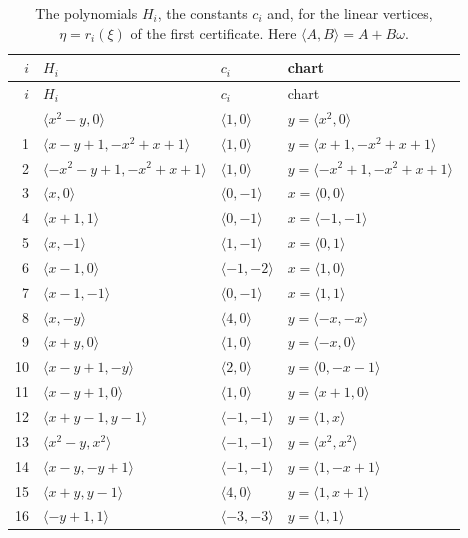 \documentclass[11pt]{article}
\begin{document}
\clearpage
\begingroup\small
\setlength{\LTcapwidth}{\textwidth}
\begin{longtable}{@{}rlll@{}}
\caption{The polynomials $H_i$, the constants $c_i$ and, for the linear vertices, $\eta=r_i(\xi)$ of the first certificate. Here $\langle A,B\rangle=A+B\omega$.}\label{tab:vert1}\\
\hline $i$ & $H_i$ & $c_i$ & chart\\\hline\endfirsthead\hline $i$ & $H_i$ & $c_i$ & chart\\\hline\endhead\hline\endfoot
0 & $\langle x^{2}-y,0\rangle$ & $\langle 1,0\rangle$ & $y=\langle x^{2},0\rangle$\\
1 & $\langle x-y+1,-x^{2}+x+1\rangle$ & $\langle 1,0\rangle$ & $y=\langle x+1,-x^{2}+x+1\rangle$\\
2 & $\langle -x^{2}-y+1,-x^{2}+x+1\rangle$ & $\langle 1,0\rangle$ & $y=\langle -x^{2}+1,-x^{2}+x+1\rangle$\\
3 & $\langle x,0\rangle$ & $\langle 0,-1\rangle$ & $x=\langle 0,0\rangle$\\
4 & $\langle x+1,1\rangle$ & $\langle 0,-1\rangle$ & $x=\langle -1,-1\rangle$\\
5 & $\langle x,-1\rangle$ & $\langle 1,-1\rangle$ & $x=\langle 0,1\rangle$\\
6 & $\langle x-1,0\rangle$ & $\langle -1,-2\rangle$ & $x=\langle 1,0\rangle$\\
7 & $\langle x-1,-1\rangle$ & $\langle 0,-1\rangle$ & $x=\langle 1,1\rangle$\\
8 & $\langle x,-y\rangle$ & $\langle 4,0\rangle$ & $y=\langle -x,-x\rangle$\\
9 & $\langle x+y,0\rangle$ & $\langle 1,0\rangle$ & $y=\langle -x,0\rangle$\\
10 & $\langle x-y+1,-y\rangle$ & $\langle 2,0\rangle$ & $y=\langle 0,-x-1\rangle$\\
11 & $\langle x-y+1,0\rangle$ & $\langle 1,0\rangle$ & $y=\langle x+1,0\rangle$\\
12 & $\langle x+y-1,y-1\rangle$ & $\langle -1,-1\rangle$ & $y=\langle 1,x\rangle$\\
13 & $\langle x^{2}-y,x^{2}\rangle$ & $\langle -1,-1\rangle$ & $y=\langle x^{2},x^{2}\rangle$\\
14 & $\langle x-y,-y+1\rangle$ & $\langle -1,-1\rangle$ & $y=\langle 1,-x+1\rangle$\\
15 & $\langle x+y,y-1\rangle$ & $\langle 4,0\rangle$ & $y=\langle 1,x+1\rangle$\\
16 & $\langle -y+1,1\rangle$ & $\langle -3,-3\rangle$ & $y=\langle 1,1\rangle$\\

\end{longtable}
\end{document}
